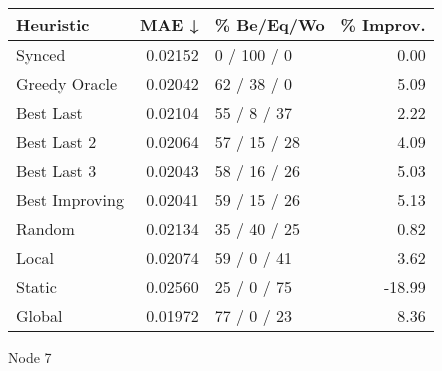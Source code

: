 \begin{tabular}{lrlr}
\toprule
\textbf{Heuristic} & \textbf{MAE ↓} & \textbf{\% Be/Eq/Wo} & \textbf{\% Improv.} \\
\midrule
            Synced &        0.02152 &          0 / 100 / 0 &                0.00 \\
     Greedy Oracle &        0.02042 &          62 / 38 / 0 &                5.09 \\
         Best Last &        0.02104 &          55 / 8 / 37 &                2.22 \\
       Best Last 2 &        0.02064 &         57 / 15 / 28 &                4.09 \\
       Best Last 3 &        0.02043 &         58 / 16 / 26 &                5.03 \\
    Best Improving &        0.02041 &         59 / 15 / 26 &                5.13 \\
            Random &        0.02134 &         35 / 40 / 25 &                0.82 \\
             Local &        0.02074 &          59 / 0 / 41 &                3.62 \\
            Static &        0.02560 &          25 / 0 / 75 &              -18.99 \\
            Global &        0.01972 &          77 / 0 / 23 &                8.36 \\
\bottomrule
\end{tabular}
\caption{Node 7}
\label{tab:iid_lr01_le1_bs2_7}
